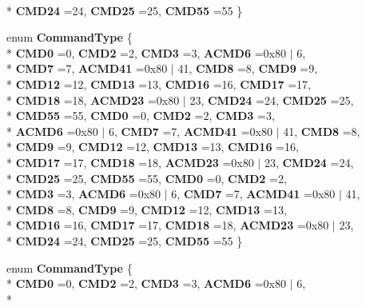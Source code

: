 \begin{DoxyCompactItemize}
\\*
{\bfseries C\-M\-D24} =24, 
{\bfseries C\-M\-D25} =25, 
{\bfseries C\-M\-D55} =55
 \}
\item 
enum {\bfseries Command\-Type} \{ \\*
{\bfseries C\-M\-D0} =0, 
{\bfseries C\-M\-D2} =2, 
{\bfseries C\-M\-D3} =3, 
{\bfseries A\-C\-M\-D6} =0x80 $\vert$ 6, 
\\*
{\bfseries C\-M\-D7} =7, 
{\bfseries A\-C\-M\-D41} =0x80 $\vert$ 41, 
{\bfseries C\-M\-D8} =8, 
{\bfseries C\-M\-D9} =9, 
\\*
{\bfseries C\-M\-D12} =12, 
{\bfseries C\-M\-D13} =13, 
{\bfseries C\-M\-D16} =16, 
{\bfseries C\-M\-D17} =17, 
\\*
{\bfseries C\-M\-D18} =18, 
{\bfseries A\-C\-M\-D23} =0x80 $\vert$ 23, 
{\bfseries C\-M\-D24} =24, 
{\bfseries C\-M\-D25} =25, 
\\*
{\bfseries C\-M\-D55} =55, 
{\bfseries C\-M\-D0} =0, 
{\bfseries C\-M\-D2} =2, 
{\bfseries C\-M\-D3} =3, 
\\*
{\bfseries A\-C\-M\-D6} =0x80 $\vert$ 6, 
{\bfseries C\-M\-D7} =7, 
{\bfseries A\-C\-M\-D41} =0x80 $\vert$ 41, 
{\bfseries C\-M\-D8} =8, 
\\*
{\bfseries C\-M\-D9} =9, 
{\bfseries C\-M\-D12} =12, 
{\bfseries C\-M\-D13} =13, 
{\bfseries C\-M\-D16} =16, 
\\*
{\bfseries C\-M\-D17} =17, 
{\bfseries C\-M\-D18} =18, 
{\bfseries A\-C\-M\-D23} =0x80 $\vert$ 23, 
{\bfseries C\-M\-D24} =24, 
\\*
{\bfseries C\-M\-D25} =25, 
{\bfseries C\-M\-D55} =55, 
{\bfseries C\-M\-D0} =0, 
{\bfseries C\-M\-D2} =2, 
\\*
{\bfseries C\-M\-D3} =3, 
{\bfseries A\-C\-M\-D6} =0x80 $\vert$ 6, 
{\bfseries C\-M\-D7} =7, 
{\bfseries A\-C\-M\-D41} =0x80 $\vert$ 41, 
\\*
{\bfseries C\-M\-D8} =8, 
{\bfseries C\-M\-D9} =9, 
{\bfseries C\-M\-D12} =12, 
{\bfseries C\-M\-D13} =13, 
\\*
{\bfseries C\-M\-D16} =16, 
{\bfseries C\-M\-D17} =17, 
{\bfseries C\-M\-D18} =18, 
{\bfseries A\-C\-M\-D23} =0x80 $\vert$ 23, 
\\*
{\bfseries C\-M\-D24} =24, 
{\bfseries C\-M\-D25} =25, 
{\bfseries C\-M\-D55} =55
 \}
\item 
enum {\bfseries Command\-Type} \{ \\*
{\bfseries C\-M\-D0} =0, 
{\bfseries C\-M\-D2} =2, 
{\bfseries C\-M\-D3} =3, 
{\bfseries A\-C\-M\-D6} =0x80 $\vert$ 6, 
\\*

\end{DoxyCompactItemize}
